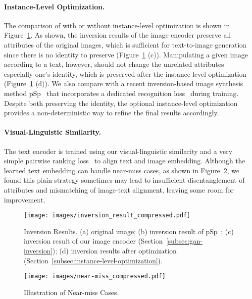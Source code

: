 \documentclass[final]{cvpr}
\begin{document}
\paragraph{Instance-Level Optimization.}
The comparison of with or without instance-level optimization is shown in Figure~\ref{fig:inversion_result}. 
As shown, the inversion results of the image encoder preserve all attributes of the original images, which is sufficient for text-to-image generation since there is no identity to preserve (Figure~\ref{fig:inversion_result} (c)). 
Manipulating a given image according to a text, however, should not change the unrelated attributes especially one's identity, which is preserved after the instance-level optimization (Figure~\ref{fig:inversion_result} (d)).  
We also compare with 
a recent inversion-based image synthesis method pSp~\cite{richardson2020encoding} that incorporates a dedicated recognition loss~\cite{deng2019arcface} during training.
Despite both preserving the identity, the optional instance-level optimization provides a non-deterministic way to refine the final results accordingly.

\vspace{-5pt}
\paragraph{Visual-Linguistic Similarity.}
The text encoder is trained using our visual-linguistic similarity and a very simple pairwise ranking loss~\cite{kiros2014unifying,dong2017semantic} to align text and image embedding.
Although the learned text embedding can handle near-miss cases, as shown in Figure~\ref{fig:near-miss}, we found this plain strategy sometimes may lead to insufficient disentanglement of attributes and mismatching of image-text alignment, leaving some room for improvement.

\begin{figure}[t]
\texttt{[image: images/inversion\_result\_compressed.pdf]}
\centering
\caption{{Inversion Results.} 
(a) original image; 
(b) inversion result of pSp~\cite{richardson2020encoding}; 
(c) inversion result of our image encoder (Section~\ref{subsec:gan-inversion}); 
(d) inversion results after optimization (Section~\ref{subsec:instance-level-optimization}).
}
\label{fig:inversion_result}
\end{figure}

\begin{figure}[t]
\begin{center}
\texttt{[image: images/near-miss\_compressed.pdf]}
\end{center}
\caption{Illustration of Near-miss Cases.}
\label{fig:near-miss}
\end{figure}
\end{document}
